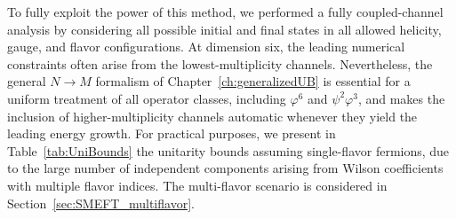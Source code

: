 To fully exploit the power of this method, we performed a fully coupled-channel analysis
by considering all possible initial and final states in all allowed helicity, gauge, and flavor configurations.
At dimension six, the leading numerical constraints often arise from the lowest-multiplicity channels. Nevertheless, the general $N \to M$ formalism of Chapter~\ref{ch:generalizedUB} is essential for a uniform treatment of all operator classes, including $\varphi^6$ and $\psi^2\varphi^3$, and makes the inclusion of higher-multiplicity channels automatic
whenever they yield the leading energy growth.
For practical purposes, we present in Table~\ref{tab:UniBounds} the unitarity bounds assuming single-flavor fermions, due to the large number of independent components arising from Wilson coefficients with multiple flavor indices.
The multi-flavor scenario is considered in Section~\ref{sec:SMEFT_multiflavor}.


